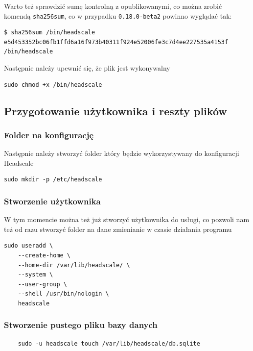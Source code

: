 \documentclass{report}
\numberwithin{equation}{section}
\begin{document}
Warto też sprawdzić sumę kontrolną z opublikowanymi, co można zrobić komendą \texttt{sha256sum}, co w przypadku \texttt{0.18.0-beta2} powinno wyglądać tak:

\begin{verbatim}
$ sha256sum /bin/headscale
e5d453352bc06fb1ffd6a16f973b40311f924e52006fe3c7d4ee227535a4153f  /bin/headscale
\end{verbatim}

Następnie należy upewnić się, że plik jest wykonywalny

\begin{verbatim}
sudo chmod +x /bin/headscale
\end{verbatim}

\subsection{Przygotowanie użytkownika i reszty plików}

\subsubsection{Folder na konfigurację}

Następnie należy stworzyć folder który będzie wykorzystywany do konfiguracji Headscale

\begin{verbatim}
sudo mkdir -p /etc/headscale
\end{verbatim}

\subsubsection{Stworzenie użytkownika}

W tym momencie można też już stworzyć użytkownika do usługi, co pozwoli nam też od razu stworzyć folder na dane zmienianie w czasie działania programu
\begin{verbatim}
sudo useradd \
	--create-home \
	--home-dir /var/lib/headscale/ \
	--system \
	--user-group \
	--shell /usr/bin/nologin \
	headscale    
\end{verbatim}

\subsubsection{Stworzenie pustego pliku bazy danych}

\begin{verbatim}
    sudo -u headscale touch /var/lib/headscale/db.sqlite
\end{verbatim}
\end{document}
